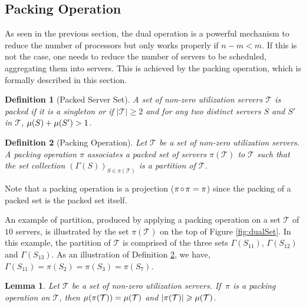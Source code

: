 \documentclass[twocolumn, compsocconf]{IEEEtran}
\newtheorem{lemma}{Lemma}[section]
\newtheorem{definition}{Definition}[section]
\newcommand{\comp}{\mbox{\ensuremath{\mspace{2mu}\circ\mspace{2mu}}}}
\renewcommand{\geq}{\geqslant}
\newcommand{\pack}{\ensuremath{\pi}}
\newcommand{\clientOf}{\ensuremath{\Gamma}\xspace}
\newcommand{\futSet}{\ensuremath{\mathcal{T}}\xspace}
\newcommand{\servSet}{\ensuremath{\mathcal{T}}}
\newcounter{proc}
\begin{document}
\subsection{Packing Operation}
\label{sec:packing}

As seen in the previous section, the dual operation is a powerful mechanism to
reduce the number of processors but only works properly if $n-m < m$. If this is
not the case, one needs to reduce the number of servers to be scheduled,
aggregating them into servers. This is achieved by the packing operation, which
is formally described in this section.

\begin{definition}[Packed Server Set]\label{dfn:packedSet}
  A set of non-zero utilization servers $\servSet$ is packed if it is a
  singleton or if $|\servSet| \geq 2$ and for any two distinct servers $S$ and
  $S'$ in $\servSet$, $\mu(S) + \mu(S') > 1$.
\end{definition}





\begin{definition}[Packing Operation]\label{dfn:packMap}
  Let $\servSet$ be a set of non-zero utilization servers. A packing operation
  $\pack$ associates a packed set of servers $\pack(\servSet)$ to $\servSet$
  such that the set collection $(\clientOf(S))_{S \in \pack(\servSet)}$ is a
  partition of $\servSet$.
\end{definition}



Note that a packing operation is a projection ($\pack \comp \pack = \pack$)
since the packing of a packed set is the packed set itself.


An example of partition, produced by applying a packing operation on a set
$\servSet$ of $10$ servers, is illustrated by the set $\pack(\futSet)$ on the
top of Figure \ref{fig:dualSet}. In this example, the partition of $\servSet$ is
comprised of the three sets $\clientOf(S_{11})$, $\clientOf(S_{12})$ and
$\clientOf(S_{13})$. As an illustration of Definition \ref{dfn:packMap}, we
have, $\clientOf(S_{11}) = \pack(S_2) = \pack(S_3) = \pack(S_7)$.

\begin{lemma}\label{lem:packMap}
  Let $\servSet$ be a set of non-zero utilization servers. If $\,\pack$ is a
  packing operation on $\servSet$, then $\util(\pack(\servSet)) =
  \util(\servSet)$ and $|\pack(\servSet)| \geqslant \util(\servSet)$.
\end{lemma}
\end{document}
